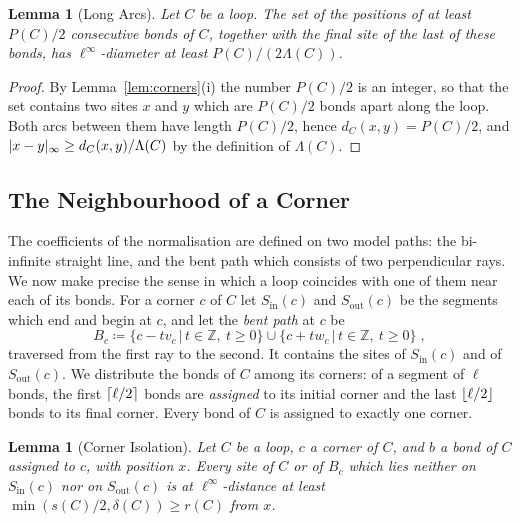 \documentclass[11pt]{preprint}
\DeclarePairedDelimiter{\abs}{\lvert}{\rvert}
\DeclarePairedDelimiter{\floor}{\lfloor}{\rfloor}
\DeclarePairedDelimiter{\ceil}{\lceil}{\rceil}
\numberwithin{equation}{section}
\newtheorem{lemma}[theorem]{Lemma}
\theoremstyle{definition}
\theoremstyle{remark}
\theoremstyle{plain}
\begin{document}
\begin{lemma}[Long Arcs]\label{lem:long-arcs}
Let $C$ be a loop. The set of the positions of at least $P(C)/2$ consecutive bonds of $C$, together with the final site of the last of these bonds, has $\ell^\infty$-diameter at least $P(C)/(2\Lambda(C))$.
\end{lemma}

\begin{proof}
By Lemma~\ref{lem:corners}(i) the number $P(C)/2$ is an integer, so that the set contains two sites $x$ and $y$ which are $P(C)/2$ bonds apart along the loop. Both arcs between them have length $P(C)/2$, hence $d_C(x, y) = P(C)/2$, and $\abs{x - y}_\infty \geq d_C(x, y)/\Lambda(C)$ by the definition of $\Lambda(C)$.
\end{proof}

\subsection{The Neighbourhood of a Corner}\label{sec:corner-neighbourhood}

The coefficients of the normalisation are defined on two model paths: the bi-infinite straight line, and the bent path which consists of two perpendicular rays. We now make precise the sense in which a loop coincides with one of them near each of its bonds. For a corner $c$ of $C$ let $S_{\mathrm{in}}(c)$ and $S_{\mathrm{out}}(c)$ be the segments which end and begin at $c$, and let the \emph{bent path} at $c$ be
\begin{equation}\label{eq:bent-path}
    B_c \coloneqq \{ c - tv_c \, | \, t \in \mathbb Z,\ t \geq 0 \} \cup \{ c + tw_c \, | \, t \in \mathbb Z,\ t \geq 0 \}\;,
\end{equation}
traversed from the first ray to the second. It contains the sites of $S_{\mathrm{in}}(c)$ and of $S_{\mathrm{out}}(c)$. We distribute the bonds of $C$ among its corners: of a segment of $\ell$ bonds, the first $\ceil{\ell/2}$ bonds are \emph{assigned} to its initial corner and the last $\floor{\ell/2}$ bonds to its final corner. Every bond of $C$ is assigned to exactly one corner.

\begin{lemma}[Corner Isolation]\label{lem:corner-isolation}
Let $C$ be a loop, $c$ a corner of $C$, and $b$ a bond of $C$ assigned to $c$, with position $x$. Every site of $C$ or of $B_c$ which lies neither on $S_{\mathrm{in}}(c)$ nor on $S_{\mathrm{out}}(c)$ is at $\ell^\infty$-distance at least $\min(s(C)/2, \delta(C)) \geq r(C)$ from $x$.
\end{lemma}
\end{document}
